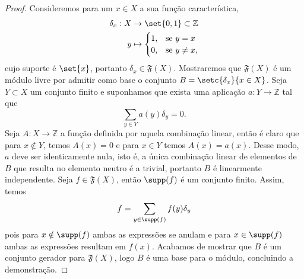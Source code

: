 \begin{proof}

    Consideremos para um \(x \in X\) a sua função característica,
    \begin{align*}
        \delta_x : X &\to \set{0,1} \subset \mathbb{Z}\\
                   y &\mapsto \begin{cases}
                         1,&\text{se }y = x\\
                         0,&\text{se }y \neq x,
                     \end{cases}
    \end{align*}
    cujo suporte é \(\set{x}\), portanto \(\delta_x \in \mathfrak{F}(X)\). Mostraremos que \(\mathfrak{F}(X)\) é um módulo livre por admitir como base o conjunto \(B = \setc{\delta_x}{x \in X}\). Seja \(Y \subset X\) um conjunto finito e suponhamos que exista uma aplicação \(a : Y \to \mathbb{Z}\) tal que
    \begin{equation*}
        \sum_{y \in Y} a(y) \delta_y = 0.
    \end{equation*}
    Seja \(A : X \to \mathbb{Z}\) a função definida por aquela combinação linear, então é claro que para \(x \notin Y\), temos \(A(x) = 0\) e para \(x \in Y\) temos \(A(x) = a(x)\). Desse modo, \(a\) deve ser identicamente nula, isto é, a única combinação linear de elementos de \(B\) que resulta no elemento neutro é a trivial, portanto \(B\) é linearmente independente. Seja \(f \in \mathfrak{F}(X)\), então \(\supp(f)\) é um conjunto finito. Assim, temos
    \begin{equation*}
        f = \sum_{y \in \supp(f)} f(y) \delta_y
    \end{equation*}
    pois para \(x \notin \supp(f)\) ambas as expressões se anulam e para \(x \in \supp(f)\) ambas as expressões resultam em \(f(x)\). Acabamos de mostrar que \(B\) é um conjunto gerador para \(\mathfrak{F}(X)\), logo \(B\) é uma base para o módulo, concluindo a demonstração.
\end{proof}

